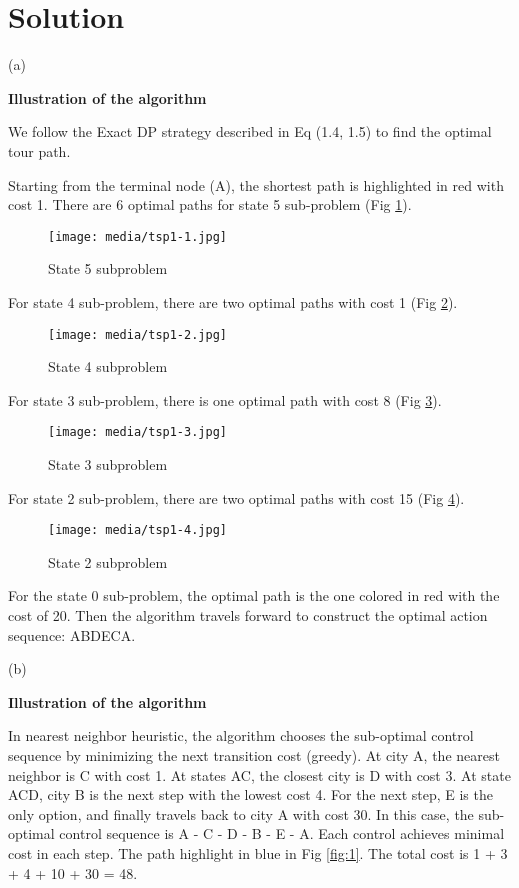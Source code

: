 \documentclass{homework}
\begin{document}
\section*{Solution}

(a) 

\textbf{Illustration of the algorithm}

We follow the Exact DP strategy described in Eq (1.4, 1.5) to find the optimal tour path.

Starting from the terminal node (A), the shortest path is highlighted in red with cost 1. There are 6 optimal paths for state 5 sub-problem (Fig \ref{fig:tsp1-1}).
\begin{figure}[ht]
    \centering
    \texttt{[image: media/tsp1-1.jpg]}
    \caption{State 5 subproblem}
    \label{fig:tsp1-1}
\end{figure}

For state 4 sub-problem, there are two optimal paths with cost 1 (Fig \ref{fig:tsp1-2}).

\begin{figure}[ht]
    \centering
    \texttt{[image: media/tsp1-2.jpg]}
    \caption{State 4 subproblem}
    \label{fig:tsp1-2}
\end{figure}

For state 3 sub-problem, there is one optimal path with cost 8 (Fig \ref{fig:tsp1-3}).

\begin{figure}[ht]
    \centering
    \texttt{[image: media/tsp1-3.jpg]}
    \caption{State 3 subproblem}
    \label{fig:tsp1-3}
\end{figure}

For state 2 sub-problem, there are two optimal paths with cost 15 (Fig \ref{fig:tsp1-4}).
\begin{figure}[ht]
    \centering
    \texttt{[image: media/tsp1-4.jpg]}
    \caption{State 2 subproblem}
    \label{fig:tsp1-4}
\end{figure}

For the state 0 sub-problem, the optimal path is the one colored in red with the cost of 20. Then the algorithm travels forward to construct the optimal action sequence: ABDECA.

(b)

\textbf{Illustration of the algorithm}

In nearest neighbor heuristic, the algorithm chooses the sub-optimal control sequence by minimizing the next transition cost (greedy). At city A, the nearest neighbor is C with cost 1. At states AC, the closest city is D with cost 3. At state ACD, city B is the next step with the lowest cost 4. For the next step, E is the only option, and finally travels back to city A with cost 30.
In this case, the sub-optimal control sequence is A - C - D - B - E - A. Each control achieves minimal cost in each step. The path highlight in blue in Fig \ref{fig:1}. The total cost is 1 + 3 + 4 + 10 + 30 = 48.
\end{document}
